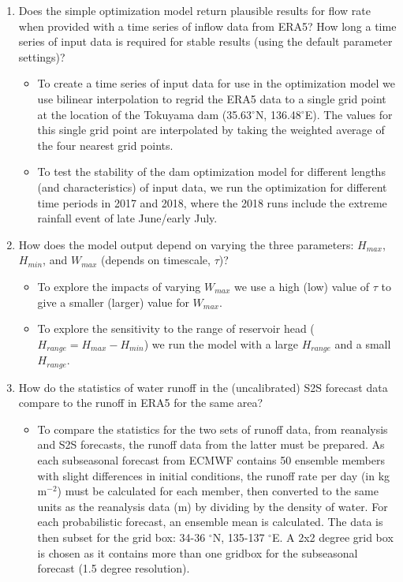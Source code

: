\documentclass[11pt]{article}
\begin{document}
\begin{enumerate}
    \item Does the simple optimization model return plausible results for flow rate when provided with a time series of inflow data from ERA5? How long a time series of input data is required for stable results (using the default parameter settings)?
        \begin{itemize}
            \item To create a time series of input data for use in the optimization model we use bilinear interpolation to regrid the ERA5 data to a single grid point at the location of the Tokuyama dam (35.63$^\circ$N, 136.48$^\circ$E). The values for this single grid point are interpolated by taking the weighted average of the four nearest grid points.
            \item To test the stability of the dam optimization model for different lengths (and characteristics) of input data, we run the optimization for different time periods in 2017 and 2018, where the 2018 runs include the extreme rainfall event of late June/early July.
        \end{itemize}
    \item How does the model output depend on varying the three parameters: $H_{max}$, $H_{min}$, and $W_{max}$ (depends on timescale, $\tau$)?
        \begin{itemize}
            \item To explore the impacts of varying $W_{max}$ we use a high (low) value of $\tau$ to give a smaller (larger) value for $W_{max}$.
            \item To explore the sensitivity to the range of reservoir head ($H_{range} = H_{max} - H_{min}$) we run the model with a large $H_{range}$ and a small $H_{range}$.
        \end{itemize}
    \item How do the statistics of water runoff in the (uncalibrated) S2S forecast data compare to the runoff in ERA5 for the same area?
        \begin{itemize}
            \item To compare the statistics for the two sets of runoff data, from reanalysis and S2S forecasts, the runoff data from the latter must be prepared. As each subseasonal forecast from ECMWF contains 50 ensemble members with slight differences in initial conditions, the runoff rate per day (in kg m$^{-2}$) must be calculated for each member, then converted to the same units as the reanalysis data (m) by dividing by the density of water. For each probabilistic forecast, an ensemble mean is calculated. The data is then subset for the grid box:  34-36 $^{\circ}$N, 135-137 $^{\circ}$E. A 2x2 degree grid box is chosen as it contains more than one gridbox for the subseasonal forecast (1.5 degree resolution). 

\end{itemize}
\end{enumerate}
\end{document}
